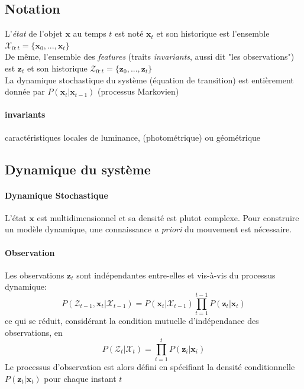 \documentclass[a4paper,12pt]{report}
\begin{document}
\subsection{Notation}
L'\textit{état} de l'objet $\mathbf{x}$ au temps $t$ est noté $\mathbf{x}_t$ et son historique est l'ensemble $\mathcal{X}_{0:t} = \{\mathbf{x}_0,...,\mathbf{x}_t\}$\\ 
De m\^eme, l'ensemble des \textit{features} (traits \textit{invariants}, aussi dit "les observations") est $\mathbf{z}_t$ et son historique $ \mathcal{Z}_{0:t}=\{\mathbf{z}_0,...,\mathbf{z}_t\}$\\
La dynamique stochastique du système (équation de transition) est entièrement donnée par $P(\mathbf{x}_t|\mathbf{x}_{t-1})$ (processus Markovien)
\paragraph{invariants}
caractéristiques locales de luminance, (photométrique) ou géométrique
\subsection{Dynamique du système}
\paragraph{Dynamique Stochastique}
L'état $\mathbf{x}$ est multidimensionnel et sa densité est plutot complexe.
Pour construire un  modèle dynamique, une connaissance \textit{a priori} du mouvement est nécessaire.
\paragraph{Observation}
Les observations $\mathbf{z}_t$ sont indépendantes entre-elles et vis-à-vis du processus dynamique:
$$P(\mathcal{Z}_{t-1},\mathbf{x}_t|\mathcal{X}_{t-1}) = P(\mathbf{x}_t|\mathcal{X}_{t-1})\prod_{t=1}^{t-1} P(\mathbf{z}_t|\mathbf{x}_t)$$
ce qui se réduit, considérant la condition mutuelle d'indépendance des observations, en
$$P(\mathcal{Z}_{t}|\mathcal{X}_{t}) = \prod_{i=1}^{t} P(\mathbf{z}_i|\mathbf{x}_i)$$
Le processus d'observation est alors défini en spécifiant la densité conditionnelle $P(\mathbf{z}_t|\mathbf{x}_t)$ pour chaque instant $t$
\end{document}
